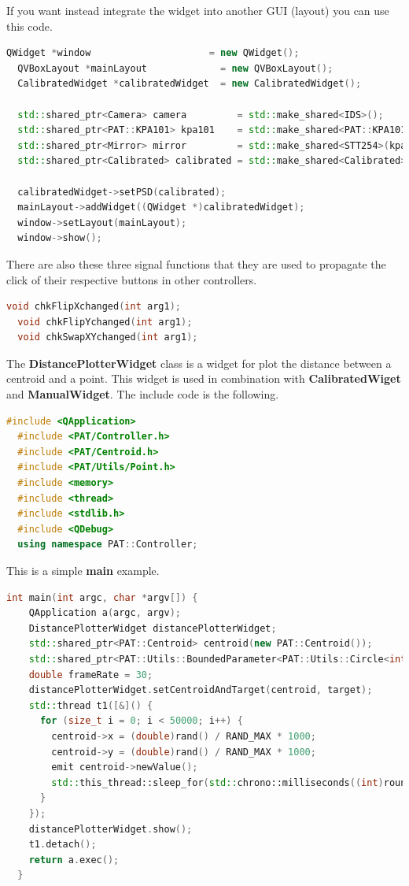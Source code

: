 If you want instead integrate the widget into another GUI (layout) you
can use this code.

\begin{lstlisting}[language=c++, gobble=2]
  QWidget *window                     = new QWidget();
  QVBoxLayout *mainLayout             = new QVBoxLayout();
  CalibratedWidget *calibratedWidget  = new CalibratedWidget();
  
  std::shared_ptr<Camera> camera         = std::make_shared<IDS>();
  std::shared_ptr<PAT::KPA101> kpa101    = std::make_shared<PAT::KPA101>();
  std::shared_ptr<Mirror> mirror         = std::make_shared<STT254>(kpa101);
  std::shared_ptr<Calibrated> calibrated = std::make_shared<Calibrated>(mirror, camera->getFrame()->getCentroid());
  
  calibratedWidget->setPSD(calibrated);
  mainLayout->addWidget((QWidget *)calibratedWidget);
  window->setLayout(mainLayout);
  window->show();
\end{lstlisting}

There are also these three signal functions that they are used to
propagate the click of their respective buttons in other controllers.

\begin{lstlisting}[language=c++, gobble=2]
  void chkFlipXchanged(int arg1);
  void chkFlipYchanged(int arg1);
  void chkSwapXYchanged(int arg1);
\end{lstlisting}


The \textbf{DistancePlotterWidget} class is a widget for plot the
distance between a centroid and a point. This widget is used in
combination with \textbf{CalibratedWiget} and \textbf{ManualWidget}. The
include code is the following.

\begin{lstlisting}[language=c++, gobble=2]
  #include <QApplication>
  #include <PAT/Controller.h>
  #include <PAT/Centroid.h>
  #include <PAT/Utils/Point.h>
  #include <memory>
  #include <thread>
  #include <stdlib.h>
  #include <QDebug>
  using namespace PAT::Controller;
\end{lstlisting}

This is a simple \textbf{main} example.

\begin{lstlisting}[language=c++, gobble=2]
  int main(int argc, char *argv[]) {
    QApplication a(argc, argv);
    DistancePlotterWidget distancePlotterWidget;
    std::shared_ptr<PAT::Centroid> centroid(new PAT::Centroid());
    std::shared_ptr<PAT::Utils::BoundedParameter<PAT::Utils::Circle<int>>> target(new PAT::Utils::BoundedParameter<PAT::Utils::Circle<int>>({0, 1000, 1, 500}, {0, 1000, 1, 500}));
    double frameRate = 30;
    distancePlotterWidget.setCentroidAndTarget(centroid, target);
    std::thread t1([&]() {
      for (size_t i = 0; i < 50000; i++) {
        centroid->x = (double)rand() / RAND_MAX * 1000;
        centroid->y = (double)rand() / RAND_MAX * 1000;
        emit centroid->newValue();
        std::this_thread::sleep_for(std::chrono::milliseconds((int)round(1000 / frameRate)));
      }
    });
    distancePlotterWidget.show();
    t1.detach();
    return a.exec();
  }
\end{lstlisting}
